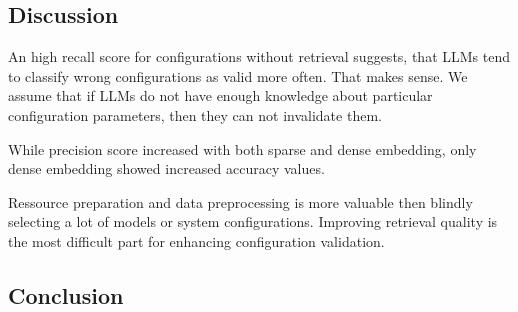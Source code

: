\subsection{Discussion} \label{sec:exp_discussion}

An high recall score for configurations without retrieval suggests, that LLMs tend to classify wrong configurations as valid more often. That makes sense. We assume that if LLMs do not have enough knowledge about particular configuration parameters, then they can not invalidate them. 

While precision score increased with both sparse and dense embedding, only dense embedding showed increased accuracy values.

Ressource preparation and data preprocessing is more valuable then blindly selecting a lot of models or system configurations. Improving retrieval quality is the most difficult part for enhancing configuration validation. 

\subsection{Conclusion} \label{sec:exp_conclusion}
